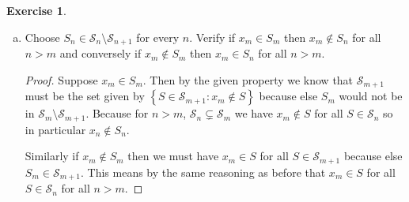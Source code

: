 \documentclass{article}
\theoremstyle{definition}
\newtheorem{question}{Exercise}
\newcommand{\set}[1]{\left\{#1\right\}}
\newcommand{\setwith}[2]{\set{#1\colon#2}}
\newcommand{\sequence}[2]{\left<#1:#2\right>}
\newenvironment{solution}{\begin{proof}[Solution]}{\end{proof}}
\begin{document}
\begin{question}
\begin{enumerate}[a.]
\begin{solution}
                  We know that for each \(x\in X\) either the set
                  \(\setwith{S\in S_{n}}{x_{n}\in S}\) or \(\setwith{S\in
                      S_{n}}{x_{n}\in S}\) must be infinite. This is because they
                  are clearly disjoint and their union is \(\mathcal{S}_{n}\)
                  which is infinite. Because \(\mathcal{S}_{n}\) is infinite it
                  has two different elements, so in particular there is an
                  \(x\in X\) such that \(x\in S\in\mathcal{S}_{n}\) but
                  \(x\notin S'\in\mathcal{S}_{n}\). Defining \(x_{n}\) to be any
                  such \(n\) and defining \(\mathcal{S}_{n+1}\) to be the larger
                  of \(\setwith{S\in S_{n}}{x_{n}\in S}\) and \(\setwith{S\in
                      S_{n}}{x_{n}\in S}\).

                  This gives recursive sequences
                  \(\sequence{x_{n}}{n\in\omega}\) and
                  \(\sequence{\mathcal{S}_{n}}{n\in\omega}\) with the desired
                  properties.
              \end{solution}

        \item Choose \(S_{n}\in\mathcal{S}_{n}\setminus\mathcal{S}_{n+1}\) for
              every \(n\). Verify if \(x_{m}\in S_{m}\) then \(x_{m}\notin
              S_{n}\) for all \(n>m\) and conversely if \(x_{m}\notin S_{m}\)
              then \(x_{m}\in S_{n}\) for all \(n>m\).

              \begin{proof}
                  Suppose \(x_{m}\in S_{m}\). Then by the given property we know
                  that \(\mathcal{S}_{m+1}\) must be the set given by
                  \(\setwith{S\in\mathcal{S}_{m+1}}{x_{m}\notin S}\) because
                  else \(S_{m}\) would not be in
                  \(\mathcal{S}_{m}\setminus\mathcal{S}_{m+1}\). Because for
                  \(n>m\), \(\mathcal{S}_{n}\subsetneq\mathcal{S}_{m}\) we have
                  \(x_{m}\notin S\) for all \(S\in\mathcal{S}_{n}\) so in
                  particular \(x_{n}\notin S_{n}\).

                  Similarly if \(x_{m}\notin S_{m}\) then we must have
                  \(x_{m}\in S\) for all \(S\in\mathcal{S}_{m+1}\) because else
                  \(S_{m}\in\mathcal{S}_{m+1}\). This means by the same
                  reasoning as before that \(x_{m}\in S\) for all
                  \(S\in\mathcal{S}_{n}\) for all \(n>m\).
              \end{proof}


\end{enumerate}
\end{question}
\end{document}
